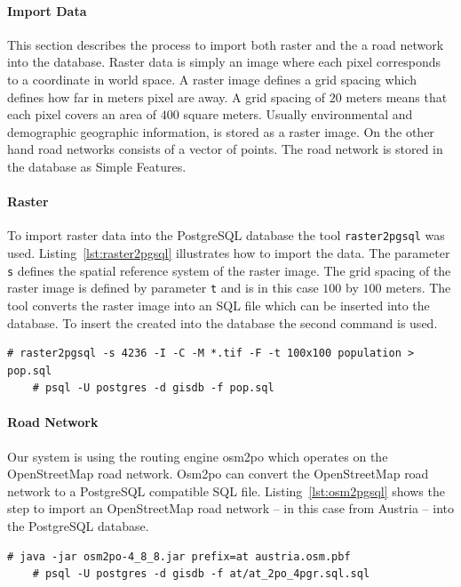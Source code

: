 \paragraph{Import Data}
This section describes the process to import both raster and the a road network into the database. Raster data is simply an image where each pixel corresponds to a coordinate in world space. A raster image defines a grid spacing which defines how far in meters pixel are away. A grid spacing of $20$ meters means that each pixel covers an area of $400$ square meters. Usually environmental and demographic geographic information, is stored as a raster image. On the other hand road networks consists of a vector of points. The road network is stored in the database as Simple Features.

\paragraph{Raster}
To import raster data into the PostgreSQL database the tool \verb|raster2pgsql| was used. Listing~\ref{lst:raster2pgsql} illustrates how to import the data. The parameter \verb|s| defines the spatial reference system of the raster image. The grid spacing of the raster image is defined by parameter \verb|t| and is in this case $100$ by $100$ meters. The tool converts the raster image into an SQL file which can be inserted into the database. To insert the created into the database the second command is used.
\begin{lstlisting}[style=BashInputStyle,caption={Import raster data into PostgreSQL database},label={lst:raster2pgsql}]
    # raster2pgsql -s 4236 -I -C -M *.tif -F -t 100x100 population > pop.sql
    # psql -U postgres -d gisdb -f pop.sql
\end{lstlisting}
\paragraph{Road Network}
Our system is using the routing engine osm2po which operates on the OpenStreetMap road network. Osm2po can convert the OpenStreetMap road network to a PostgreSQL compatible SQL file. Listing~\ref{lst:osm2pgsql} shows the step to import an OpenStreetMap road network -- in this case from Austria -- into the PostgreSQL  database.
\begin{lstlisting}[style=BashInputStyle,caption={Import OpenStreetmap data into PostgreSQL database},label={lst:osm2pgsql}]
    # java -jar osm2po-4_8_8.jar prefix=at austria.osm.pbf
    # psql -U postgres -d gisdb -f at/at_2po_4pgr.sql.sql
\end{lstlisting}
